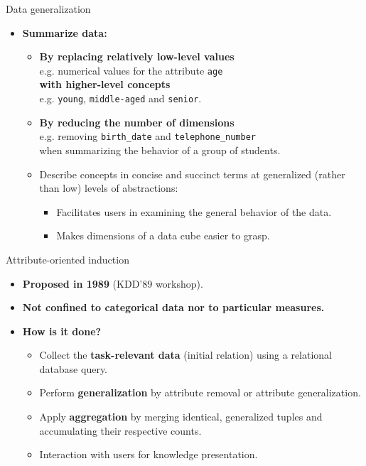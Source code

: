 \documentclass[aspectratio=169,t]{beamer}
\begin{document}
  { 
    \begin{frame}{Data generalization}
    \begin{itemize}
      \item \textbf{Summarize data:}
      \begin{itemize}
        \item \textbf{By replacing relatively low-level values} \\
        e.g. numerical values for the attribute \texttt{age} \\
        \textbf{with higher-level concepts}\\
        e.g. \texttt{young}, \texttt{middle-aged} and \texttt{senior}.
        \item \textbf{By reducing the number of dimensions}\\
              e.g. removing \texttt{birth\_date} and \texttt{telephone\_number} \\ when summarizing the behavior of a group of students.
        \item Describe concepts in concise and succinct terms at generalized (rather than low) levels of abstractions:
        \begin{itemize}
          \item Facilitates users in examining the general behavior of the data.
          \item Makes dimensions of a data cube easier to grasp.
        \end{itemize}
      \end{itemize}
    \end{itemize}
    \end{frame}
  }

  { 
    \begin{frame}{Attribute-oriented induction}
    \begin{itemize}
      \item \textbf{Proposed in 1989} (KDD'89 workshop).
      \item \textbf{Not confined to categorical data nor to particular measures.}
      \item \textbf{How is it done?}
      \begin{itemize}
        \item Collect the \textbf{\color{airforceblue}task-relevant data} (initial relation) using a relational database query.
        \item Perform \textbf{\color{airforceblue}generalization} by attribute removal or attribute generalization.
        \item Apply \textbf{\color{airforceblue}aggregation} by merging identical, generalized tuples and \\ accumulating their respective counts.
        \item Interaction with users for knowledge presentation.
      \end{itemize}
    \end{itemize}
    \end{frame}
  }
\end{document}
